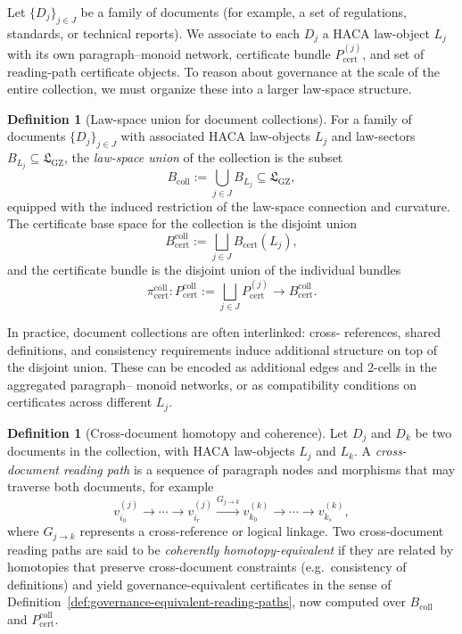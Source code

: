 \documentclass[11pt]{book}
\theoremstyle{plain}
\theoremstyle{definition}
\newtheorem{definition}[theorem]{Definition}
\theoremstyle{remark}
\newcommand{\GZLS}{\ensuremath{\mathfrak{L}_{\mathrm{GZ}}}}       \newcommand{\GZLT}{\ensuremath{M_{!w}}}                           \newcommand{\GZLOC}{\ensuremath{A_M}}                             \newcommand{\GZLC}{\ensuremath{\omega_{\mathrm{law}}}}            \newcommand{\GZLCurv}{\ensuremath{\mathcal{F}_{\mathrm{law}}}}
\begin{document}
Let $\{D_j\}_{j\in J}$ be a family of documents (for example, a set
of regulations, standards, or technical reports). We associate to each
$D_j$ a HACA law-object $L_j$ with its own paragraph–monoid network,
certificate bundle $P_{\mathrm{cert}}^{(j)}$, and set of reading-path
certificate objects. To reason about governance at the scale of the
entire collection, we must organize these into a larger law-space
structure.

\begin{definition}[Law-space union for document collections]
\label{def:lawspace-union-doc-collection}
For a family of documents $\{D_j\}_{j\in J}$ with associated HACA
law-objects $L_j$ and law-sectors $B_{L_j}\subseteq\GZLS$, the
\emph{law-space union} of the collection is the subset
\[
  B_{\mathrm{coll}}
  :=
  \bigcup_{j\in J} B_{L_j}
  \subseteq\GZLS,
\]
equipped with the induced restriction of the law-space connection
and curvature. The certificate base space for the collection is the
disjoint union
\[
  B_{\mathrm{cert}}^{\mathrm{coll}}
  :=
  \bigsqcup_{j\in J} B_{\mathrm{cert}}(L_j),
\]
and the certificate bundle is the disjoint union of the individual
bundles
\[
  \pi_{\mathrm{cert}}^{\mathrm{coll}}:
  P_{\mathrm{cert}}^{\mathrm{coll}}
  :=
  \bigsqcup_{j\in J} P_{\mathrm{cert}}^{(j)}
  \longrightarrow
  B_{\mathrm{cert}}^{\mathrm{coll}}.
\]
\end{definition}

In practice, document collections are often interlinked: cross-
references, shared definitions, and consistency requirements induce
additional structure on top of the disjoint union. These can be
encoded as additional edges and 2-cells in the aggregated paragraph–
monoid networks, or as compatibility conditions on certificates
across different $L_j$.

\begin{definition}[Cross-document homotopy and coherence]
\label{def:cross-document-homotopy}
Let $D_j$ and $D_k$ be two documents in the collection, with HACA
law-objects $L_j$ and $L_k$. A \emph{cross-document reading path} is
a sequence of paragraph nodes and morphisms that may traverse both
documents, for example
\[
  v_{i_0}^{(j)}\to\cdots\to v_{i_r}^{(j)}
  \xrightarrow{G_{j\to k}}
  v_{k_0}^{(k)}\to\cdots\to v_{k_s}^{(k)},
\]
where $G_{j\to k}$ represents a cross-reference or logical linkage.
Two cross-document reading paths are said to be \emph{coherently
homotopy-equivalent} if they are related by homotopies that preserve
cross-document constraints (e.g.\ consistency of definitions) and
yield governance-equivalent certificates in the sense of
Definition~\ref{def:governance-equivalent-reading-paths}, now
computed over $B_{\mathrm{coll}}$ and
$P_{\mathrm{cert}}^{\mathrm{coll}}$.
\end{definition}
\end{document}
